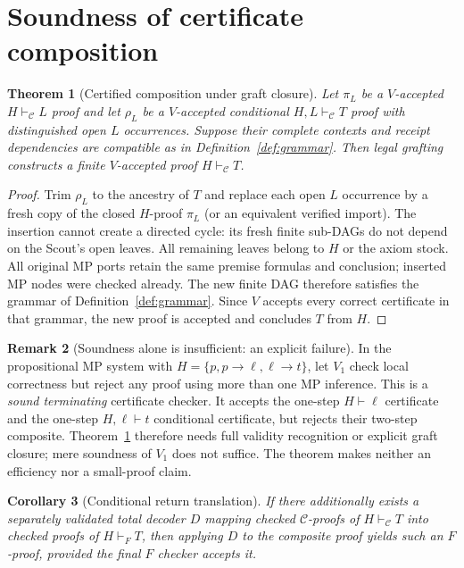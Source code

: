 \documentclass[11pt,letterpaper]{article}
\newtheorem{theorem}{Theorem}[section]
\newtheorem{corollary}[theorem]{Corollary}
\theoremstyle{definition}
\newtheorem{remark}[theorem]{Remark}
\newcommand{\C}{\mathcal C}
\newcommand{\vdC}{\vdash_{\mathcal C}}
\begin{document}
\section{Soundness of certificate composition}
\begin{theorem}[Certified composition under graft closure]\label{th:compose}
Let $\pi_L$ be a $V$-accepted $H\vdC L$ proof and let $\rho_L$ be a
$V$-accepted conditional $H,L\vdC T$ proof with distinguished open
$L$ occurrences. Suppose their complete contexts and receipt dependencies
are compatible as in Definition~\ref{def:grammar}. Then legal grafting
constructs a finite $V$-accepted proof $H\vdC T$.
\end{theorem}
\begin{proof}
Trim $\rho_L$ to the ancestry of $T$ and replace each open $L$ occurrence
by a fresh copy of the closed $H$-proof $\pi_L$ (or an equivalent
verified import). The insertion cannot create a directed cycle: its
fresh finite sub-DAGs do not depend on the Scout's open leaves. All
remaining leaves belong to $H$ or the axiom stock. All original MP
ports retain the same premise formulas and conclusion; inserted MP nodes
were checked already. The new finite DAG therefore satisfies the grammar
of Definition~\ref{def:grammar}. Since $V$ accepts every correct certificate
in that grammar, the new proof is accepted and concludes $T$ from $H$.
\end{proof}

\begin{remark}[Soundness alone is insufficient: an explicit failure]\label{rem:cap}
In the propositional MP system with $H=\{p,p\to \ell,\ell\to t\}$,
let $V_1$ check local correctness but reject any proof using more than
one MP inference. This is a \emph{sound terminating} certificate checker.
It accepts the one-step $H\vdash \ell$ certificate and the one-step
$H,\ell\vdash t$ conditional certificate, but rejects their two-step
composite. Theorem~\ref{th:compose} therefore needs full validity
recognition or explicit graft closure; mere soundness of $V_1$ does not
suffice. The theorem makes neither an efficiency nor a small-proof claim.
\end{remark}

\begin{corollary}[Conditional return translation]
If there additionally exists a separately validated total decoder
$D$ mapping checked $\C$-proofs of $H\vdC T$ into checked proofs of
$H\vdash_F T$, then applying $D$ to the composite proof yields such an
$F$-proof, provided the final $F$ checker accepts it.
\end{corollary}
\end{document}
